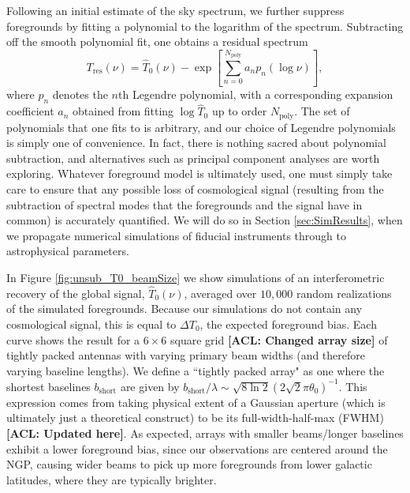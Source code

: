 \documentclass[twocolumn,apj,numberedappendix]{emulateapj}
\newcommand{\acl}[1]{{\color{red} \textbf{[ACL:  #1]}}}
\begin{document}
Following an initial estimate of the sky spectrum, we further suppress foregrounds by fitting a polynomial to the logarithm of the spectrum. Subtracting off the smooth polynomial fit, one obtains a residual spectrum
\begin{equation}
\label{eq:FgFit}
T_\textrm{res} (\nu) = \widehat{T}_0(\nu) -  \exp \left[ \sum_{n=0}^{N_\textrm{poly}} a_n p_n( \log \nu) \right],
\end{equation}
where $p_n$ denotes the $n$th Legendre polynomial, with a corresponding expansion coefficient $a_n$ obtained from fitting $\log \widehat{T}_0$ up to order $N_\textrm{poly}$. The set of polynomials that one fits to is arbitrary, and our choice of Legendre polynomials is simply one of convenience. In fact, there is nothing sacred about polynomial subtraction, and alternatives such as principal component analyses \citep{Liu_21cm_Fg,L13,Liu_Switzer_2014} are worth exploring. Whatever foreground model is ultimately used, one must simply take care to ensure that any possible loss of cosmological signal (resulting from the subtraction of spectral modes that the foregrounds and the signal have in common) is accurately quantified. We will do so in Section \ref{sec:SimResults}, when we propagate numerical simulations of fiducial instruments through to astrophysical parameters.

In Figure \ref{fig:unsub_T0_beamSize} we show simulations of an interferometric recovery of the global signal, $\widehat{T}_0 (\nu)$, averaged over $10,000$ random realizations of the simulated foregrounds. Because our simulations do not contain any cosmological signal, this is equal to $\Delta T_0$, the expected foreground bias. Each curve shows the result for a $6\times6$ square grid \acl{Changed array size} of tightly packed antennas with varying primary beam widths (and therefore varying baseline lengths). We define a ``tightly packed array" as one where the shortest baselines $b_\textrm{short}$ are given by $b_\textrm{short}/ \lambda \sim \sqrt{8 \ln 2} (2 \sqrt{2} \pi \theta_0)^{-1}$. This expression comes from taking physical extent of a Gaussian aperture (which is ultimately just a theoretical construct) to be its full-width-half-max (FWHM) \acl{Updated here}. As expected, arrays with smaller beams/longer baselines exhibit a lower foreground bias, since our observations are centered around the NGP, causing wider beams to pick up more foregrounds from lower galactic latitudes, where they are typically brighter.
\end{document}
